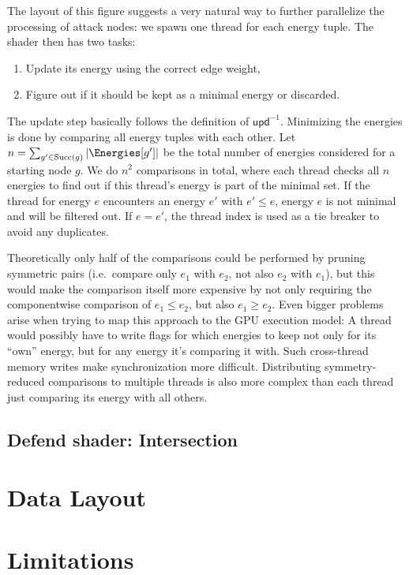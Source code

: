 The layout of this figure suggests a very natural way to further parallelize
the processing of attack nodes:
we spawn one thread for each energy tuple.
The shader then has two tasks:
\begin{enumerate}
    \item Update its energy using the correct edge weight,
    \item Figure out if it should be kept as a minimal energy or discarded.
\end{enumerate}

The update step basically follows the definition of $\mathsf{upd}^{-1}$.
Minimizing the energies is done by comparing all energy tuples with each other.
Let $n = \sum_{g' \in \mathrm{Succ}(g)} | \Energies[g'] |$ be the total number
of energies considered for a starting node $g$.
We do $n^2$ comparisons in total, where each thread checks all $n$
energies to find out if this thread's energy is part of the minimal set.
If the thread for energy $e$ encounters an energy $e'$ with $e' \leq e$,
energy $e$ is not minimal and will be filtered out. If $e = e'$, the thread
index is used as a tie breaker to avoid any duplicates.

Theoretically only half of the comparisons could be performed by pruning symmetric
pairs (i.e.\ compare only $e_1$ with $e_2$, not also $e_2$ with $e_1$),
but this would make the comparison itself more expensive by not only requiring
the componentwise comparison of $e_1 \leq e_2$, but also $e_1 \geq e_2$.
Even bigger problems arise when trying to map this approach to the GPU
execution model:
A thread would possibly have to write flags for which energies to keep not only
for its \enquote{own} energy,
but for any energy it's comparing it with.
Such cross-thread memory writes make synchronization more difficult.
Distributing symmetry-reduced comparisons to multiple threads is also
more complex than each thread just comparing its energy with all others.

\subsection{Defend shader: Intersection}

\section{Data Layout}

\section{Limitations}
